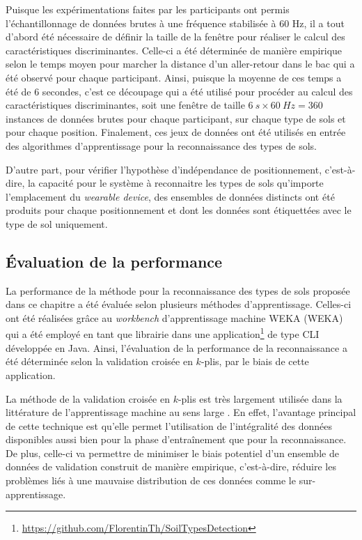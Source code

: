 Puisque les expérimentations faites par les participants ont permis l'échantillonnage de données brutes à une fréquence stabilisée à 60 Hz, il a tout d'abord été nécessaire de définir la taille de la fenêtre pour réaliser le calcul des caractéristiques discriminantes. Celle-ci a été déterminée de manière empirique selon le temps moyen pour marcher la distance d'un aller-retour dans le bac qui a été observé pour chaque participant. Ainsi, puisque la moyenne de ces temps a été de 6 secondes, c'est ce découpage qui a été utilisé pour procéder au calcul des caractéristiques discriminantes, soit une fenêtre de taille $6\:s \times 60\:Hz = 360$ instances de données brutes pour chaque participant, sur chaque type de sols et pour chaque position. Finalement, ces jeux de données ont été utilisés en entrée des algorithmes d'apprentissage pour la reconnaissance des types de sols.

D'autre part, pour vérifier l'hypothèse d'indépendance de positionnement, c'est-à-dire, la capacité pour le système à reconnaitre les types de sols qu'importe l'emplacement du \textit{wearable device}, des ensembles de données distincts ont été produits pour chaque positionnement et dont les données sont étiquettées avec le type de sol uniquement.

\subsection{Évaluation de la performance}

La performance de la méthode pour la reconnaissance des types de sols proposée dans ce chapitre a été évaluée selon plusieurs méthodes d'apprentissage. Celles-ci ont été réalisées grâce au \textit{workbench} d'apprentissage machine \acs{WEKA} (\acl{WEKA}) \citep{Holmes1994} qui a été employé en tant que librairie dans une application\footnote{\url{https://github.com/FlorentinTh/SoilTypesDetection}} de type \ac{CLI} développée en Java. Ainsi, l'évaluation de la performance de la reconnaissance a été déterminée selon la validation croisée en $k$-plis, par le biais de cette application.

La méthode de la validation croisée en $k$-plis est très largement utilisée dans la littérature de l'apprentissage machine au sens large \citep{Vail2004, Arlot2010, Kertesz2016}. En effet, l'avantage principal de cette technique est qu'elle permet l'utilisation de l'intégralité des données disponibles aussi bien pour la phase d'entraînement que pour la reconnaissance. De plus, celle-ci va permettre de minimiser le biais potentiel d'un ensemble de données de validation construit de manière empirique, c'est-à-dire, réduire les problèmes liés à une mauvaise distribution de ces données comme le sur-apprentissage.

